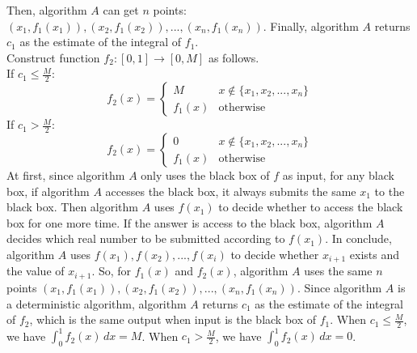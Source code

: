 Then, algorithm $A$ can get $n$ points: $(x_1,f_1(x_1)),(x_2,f_1(x_2)),...,(x_n,f_1(x_n))$.
Finally, algorithm $A$ returns $c_1$ as the estimate of the integral of $f_1$.\\
Construct function $f_2:[0, 1]\rightarrow [0, M ]$ as follows. \\
If $c_1 \le \frac{M}{2}$:
\begin{equation}
   \nonumber  f_2(x)=
    \begin{cases}
    M& x\notin\{x_1,x_2,...,x_n\}\\
    f_1(x)& \text{otherwise}
    \end{cases}
\end{equation}
If $c_1 > \frac{M}{2}$:
\begin{equation}
   \nonumber  f_2(x)=
    \begin{cases}
    0& x\notin\{x_1,x_2,...,x_n\}\\
    f_1(x)& \text{otherwise}
    \end{cases}
\end{equation}
At first, since algorithm $A$ only uses the black box of $f$ as input, 
for any black box, if algorithm $A$ accesses the black box,
it always submits the same $x_1$ to the black box.
Then algorithm $A$ uses $f(x_1)$ to decide whether to access the black box for one more time.
If the answer is access to the black box, algorithm $A$ decides which real number to be submitted according to $f(x_1)$.
In conclude, algorithm $A$ uses $f(x_1), f(x_2),...,f(x_i)$ to decide whether $x_{i+1}$ exists and the value of $x_{i+1}$.
So, for $f_1(x)$ and $f_2(x)$, algorithm $A$ uses the same $n$ points $(x_1,f_1(x_1)),(x_2,f_1(x_2)),...,(x_n,f_1(x_n))$.
Since algorithm $A$ is a deterministic algorithm, 
algorithm $A$ returns $c_1$ as the estimate of the integral of $f_2$, which is the same output when input is the black box of $f_1$.
When $c_1 \le \frac{M}{2}$, we have $\int_{0}^{1} f_2(x) \,dx=M$.
When $c_1 > \frac{M}{2}$, we have $\int_{0}^{1} f_2(x) \,dx=0$.
